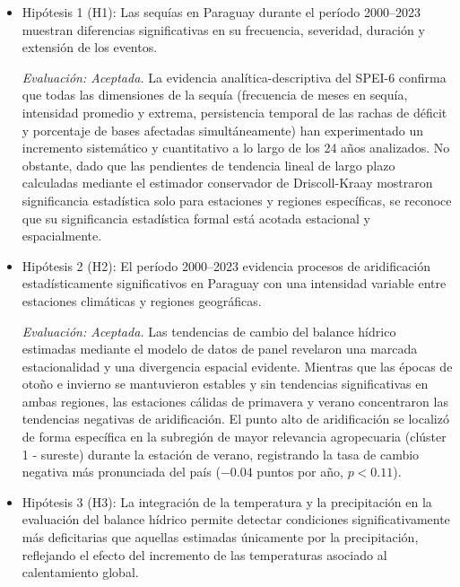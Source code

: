 \begin{itemize}
    \item {Hipótesis 1 (H1): Las sequías en Paraguay durante el período 2000--2023 muestran diferencias significativas en su frecuencia, severidad, duración y extensión de los eventos.}
    
    \textit{Evaluación: Aceptada.} La evidencia analítica-descriptiva del SPEI-6 confirma que todas las dimensiones de la sequía (frecuencia de meses en sequía, intensidad promedio y extrema, persistencia temporal de las rachas de déficit y porcentaje de bases afectadas simultáneamente) han experimentado un incremento sistemático y cuantitativo a lo largo de los 24 años analizados. No obstante, dado que las pendientes de tendencia lineal de largo plazo calculadas mediante el estimador conservador de Driscoll-Kraay mostraron significancia estadística solo para estaciones y regiones específicas, se reconoce que su significancia estadística formal está acotada estacional y espacialmente.

    \item {Hipótesis 2 (H2): El período 2000--2023 evidencia procesos de aridificación estadísticamente significativos en Paraguay con una intensidad variable entre estaciones climáticas y regiones geográficas.}
    
    \textit{Evaluación: Aceptada.} Las tendencias de cambio del balance hídrico estimadas mediante el modelo de datos de panel revelaron una marcada estacionalidad y una divergencia espacial evidente. Mientras que las épocas de otoño e invierno se mantuvieron estables y sin tendencias significativas en ambas regiones, las estaciones cálidas de primavera y verano concentraron las tendencias negativas de aridificación. El punto alto de aridificación se localizó de forma específica en la subregión de mayor relevancia agropecuaria (clúster 1 - sureste) durante la estación de verano, registrando la tasa de cambio negativa más pronunciada del país ($-0.04$ puntos por año, $p < 0.11$).

    \item {Hipótesis 3 (H3): La integración de la temperatura y la precipitación en la evaluación del balance hídrico permite detectar condiciones significativamente más deficitarias que aquellas estimadas únicamente por la precipitación, reflejando el efecto del incremento de las temperaturas asociado al calentamiento global.}
    

\end{itemize}
